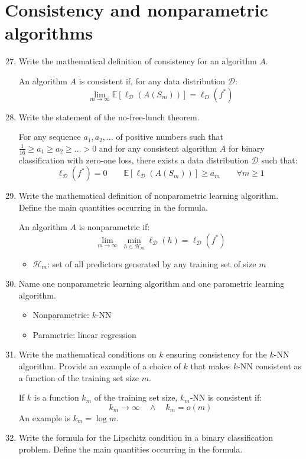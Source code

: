\documentclass[a4paper]{article}
\newcommand{\D}{\ensuremath{\mathcal{D}}}
\newcommand{\E}{\ensuremath{\mathbb{E}}}
\newcommand{\Hpred}{\ensuremath{\mathcal{H}}}
\begin{document}
\section{Consistency and nonparametric algorithms}
\begin{enumerate}
    \setcounter{enumi}{26}
    \item Write the mathematical definition of consistency for an algorithm $A$.
    
    An algorithm $A$ is consistent if, for any data distribution $\D$:
    $$ \lim_{m\to\infty} \E[\ell_\D(A(S_m))]=\ell_D(f^*) $$
    \item Write the statement of the no-free-lunch theorem.
    
    For any sequence $a_1,a_2,\dots$ of positive numbers such that 
    $\frac{1}{16}\geq a_1\geq a_2\geq\dots>0$ and for any consistent algorithm $A$ for
    binary classification with zero-one loss, there exists a data distribution $\D$ such that:
    $$\ell_\D(f^*)=0 \qquad \E[\ell_\D(A(S_m))]\geq a_m \qquad \forall m\geq 1$$
    \item Write the mathematical definition of nonparametric learning algorithm.
        Define the main quantities occurring in the formula.
    
        An algorithm $A$ is nonparametric if:
        $$ \lim_{m\to\infty} \ \min_{h\in\Hpred_m}\ell_\D(h) = \ell_\D(f^*) $$
        \begin{itemize}
            \item $\Hpred_m$: set of all predictors generated by any training set of size $m$
        \end{itemize}
    \item Name one nonparametric learning algorithm and one parametric learning algorithm.
    
    \begin{itemize}
        \item Nonparametric: $k$-NN
        \item Parametric: linear regression
    \end{itemize}
    \item Write the mathematical conditions on $k$ ensuring consistency for the $k$-NN algorithm.
        Provide an example of a choice of $k$ that makes $k$-NN consistent as a function of the
        training set size $m$.

        If $k$ is a function $k_m$ of the training set size, $k_m$-NN is consistent if:
        $$ k_m\to\infty \quad \wedge \quad k_m=o(m) $$
        An example is $k_m=\log{m}$.
    \item Write the formula for the Lipschitz condition in a binary classification problem. 
        Define the main quantities occurring in the formula.


\end{enumerate}
\end{document}
